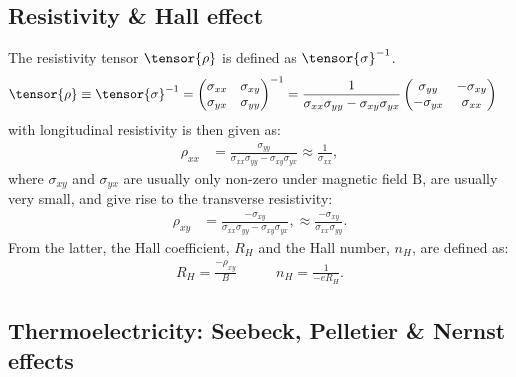 \documentclass[notitlepage,11pt,nofootinbib]{revtex4-1}
\renewcommand{\vec}[1]{\bm{\mathrm{#1}}}
\begin{document}
\subsection{Resistivity \& Hall effect}

The resistivity tensor $\tensor{\rho}$ is defined as $\tensor{\sigma}^{-1}$.
\begin{align}
\tensor{\rho} &\equiv \tensor{\sigma}^{-1}
=
\begin{pmatrix}
\sigma_{xx} & \sigma_{xy}\\
\sigma_{yx} & \sigma_{yy}
\end{pmatrix}^{-1}
=
\frac{1}{\sigma_{xx}\sigma_{yy}-\sigma_{xy}\sigma_{yx}}
\begin{pmatrix}
\sigma_{yy} & -\sigma_{xy}\\
-\sigma_{yx} & \sigma_{xx}
\end{pmatrix}
\end{align}
with longitudinal resistivity is then given as:
\begin{align}
\rho_{xx} 
&= 
\frac{\sigma_{yy}}{\sigma_{xx}\sigma_{yy} - \sigma_{xy}\sigma_{yx}}
\approx
\boxed{
\frac{1}{\sigma_{xx}}
},
\label{eq_resistivity}
\end{align}
where $\sigma_{xy}$ and $\sigma_{yx}$ are usually only non-zero under magnetic field $\vec B$, are usually very small, and give rise to the transverse resistivity:
\begin{align}
\rho_{xy} 
&= 
\frac{-\sigma_{xy}}{\sigma_{xx}\sigma_{yy} - \sigma_{xy}\sigma_{yx}},
\approx
\boxed{
\frac{-\sigma_{xy}}{\sigma_{xx}\sigma_{yy}}
}.
\end{align}
From the latter, the Hall coefficient, $R_H$ and the Hall number, $n_H$, are defined as:
\begin{align}
R_H = \frac{-\rho_{xy}}{B}
&\qquad
n_H = \frac{1}{-eR_H}.
\end{align}



\subsection{Thermoelectricity: Seebeck, Pelletier \& Nernst effects}
\end{document}
